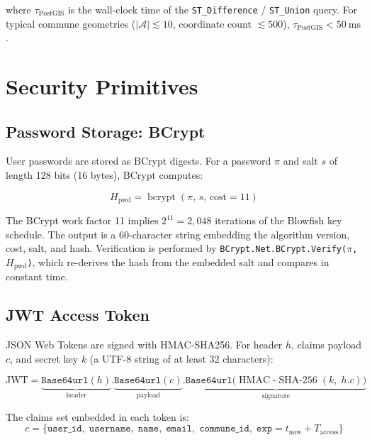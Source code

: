 \documentclass[12pt,a4paper]{article}
\theoremstyle{definition}
\theoremstyle{plain}
\theoremstyle{remark}
\newcommand{\abs}[1]{\left\lvert #1 \right\rvert}
\newcommand{\HMAC}{\operatorname{HMAC}}
\newcommand{\SHA}{\operatorname{SHA\text{-}256}}
\newcommand{\bcrypt}{\operatorname{bcrypt}}
\begin{document}
where $\tau_{\text{PostGIS}}$ is the wall-clock time of the
\texttt{ST\_Difference} / \texttt{ST\_Union} query. For typical commune
geometries ($\abs{\mathcal{A}} \lesssim 10$, coordinate count
$\lesssim 500$), $\tau_{\text{PostGIS}} < 50\ \mathrm{ms}$.

\section{Security Primitives}
\label{sec:security}

\subsection{Password Storage: BCrypt}

User passwords are stored as BCrypt digests. For a password $\pi$ and
salt $s$ of length 128 bits (16 bytes), BCrypt computes:

\begin{equation}
  H_{\text{pwd}} = \bcrypt(\pi,\, s,\, \text{cost} = 11)
  \label{eq:bcrypt}
\end{equation}

The BCrypt work factor 11 implies $2^{11} = 2{,}048$ iterations of the
Blowfish key schedule. The output is a 60-character string embedding the
algorithm version, cost, salt, and hash. Verification is performed by
\texttt{BCrypt.Net.BCrypt.Verify($\pi$, $H_{\text{pwd}}$)}, which re-derives
the hash from the embedded salt and compares in constant time.

\subsection{JWT Access Token}

JSON Web Tokens are signed with HMAC-SHA256. For header $h$, claims
payload $c$, and secret key $k$ (a UTF-8 string of at least 32 characters):

\begin{equation}
  \text{JWT} =
    \underbrace{\texttt{Base64url}(h)}_{\text{header}}
    \texttt{.}
    \underbrace{\texttt{Base64url}(c)}_{\text{payload}}
    \texttt{.}
    \underbrace{\texttt{Base64url}\bigl(\HMAC\text{-}\SHA(k,\; h \texttt{.} c)\bigr)}_{\text{signature}}
  \label{eq:jwt}
\end{equation}

The claims set embedded in each token is:
\begin{equation}
  c = \{
    \texttt{user\_id},\;
    \texttt{username},\;
    \texttt{name},\;
    \texttt{email},\;
    \texttt{commune\_id},\;
    \texttt{exp} = t_{\text{now}} + T_{\text{access}}
  \}
  \label{eq:jwt_claims}
\end{equation}
\end{document}
